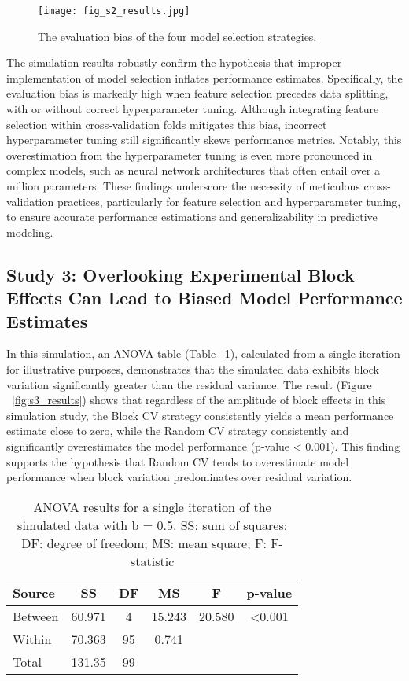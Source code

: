\begin{figure}[h]
    \centering
    \texttt{[image: fig\_s2\_results.jpg]}
    \caption{The evaluation bias of the four model selection strategies.}
    \label{fig:s2_results}
\end{figure}

The simulation results robustly confirm the hypothesis that improper implementation of model selection inflates performance estimates. Specifically, the evaluation bias is markedly high when feature selection precedes data splitting, with or without correct hyperparameter tuning. Although integrating feature selection within cross-validation folds mitigates this bias, incorrect hyperparameter tuning still significantly skews performance metrics. Notably, this overestimation from the hyperparameter tuning is even more pronounced in complex models, such as neural network architectures that often entail over a million parameters. These findings underscore the necessity of meticulous cross-validation practices, particularly for feature selection and hyperparameter tuning, to ensure accurate performance estimations and generalizability in predictive modeling.

\subsection{Study 3: Overlooking Experimental Block Effects Can Lead to Biased Model Performance Estimates}

In this simulation, an ANOVA table (Table ~\ref{tab:anova}), calculated from a single iteration for illustrative purposes, demonstrates that the simulated data exhibits block variation significantly greater than the residual variance. The result (Figure ~\ref{fig:s3_results}) shows that regardless of the amplitude of block effects in this simulation study, the Block CV strategy consistently yields a mean performance estimate close to zero, while the Random CV strategy consistently and significantly overestimates the model performance (p-value < 0.001). This finding supports the hypothesis that Random CV tends to overestimate model performance when block variation predominates over residual variation.

\begin{table}
    \caption{ANOVA results for a single iteration of the simulated data with b = 0.5. SS: sum of squares; DF: degree of freedom; MS: mean square; F: F-statistic}
    \centering
    \begin{tabular}{lccccc}
        \toprule
        Source & SS & DF & MS & F & p-value \\
        \midrule
        Between & 60.971 & 4 & 15.243 & 20.580 & <0.001 \\
        Within & 70.363 & 95 & 0.741 & &  \\
        \cmidrule(r){1-3}
        Total & 131.35 & 99 & & & \\
        \bottomrule
    \end{tabular}
    \label{tab:anova}
\end{table}

